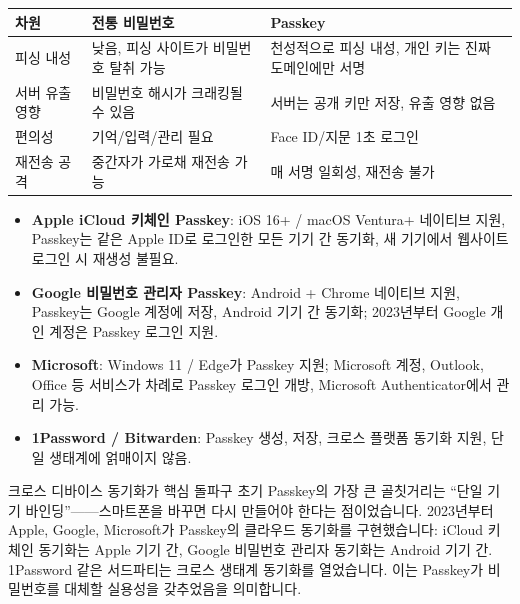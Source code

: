 
\begin{center}
\begin{tabularx}{\linewidth}{|X|X|X|}
\hline
\textbf{차원} & \textbf{전통 비밀번호} & \textbf{Passkey} \tabularnewline
\hline
피싱 내성 & 낮음, 피싱 사이트가 비밀번호 탈취 가능 & 천성적으로 피싱 내성, 개인 키는 진짜 도메인에만 서명 \tabularnewline
서버 유출 영향 & 비밀번호 해시가 크래킹될 수 있음 & 서버는 공개 키만 저장, 유출 영향 없음 \tabularnewline
편의성 & 기억/입력/관리 필요 & Face ID/지문 1초 로그인 \tabularnewline
재전송 공격 & 중간자가 가로채 재전송 가능 & 매 서명 일회성, 재전송 불가 \tabularnewline
\hline
\end{tabularx}
\end{center}


\begin{itemize}
  \item \textbf{Apple iCloud 키체인 Passkey}: iOS 16+ / macOS Ventura+ 네이티브 지원, Passkey는 같은 Apple ID로 로그인한 모든 기기 간 동기화, 새 기기에서 웹사이트 로그인 시 재생성 불필요.
  \item \textbf{Google 비밀번호 관리자 Passkey}: Android + Chrome 네이티브 지원, Passkey는 Google 계정에 저장, Android 기기 간 동기화; 2023년부터 Google 개인 계정은 Passkey 로그인 지원.
  \item \textbf{Microsoft}: Windows 11 / Edge가 Passkey 지원; Microsoft 계정, Outlook, Office 등 서비스가 차례로 Passkey 로그인 개방, Microsoft Authenticator에서 관리 가능.
  \item \textbf{1Password / Bitwarden}: Passkey 생성, 저장, 크로스 플랫폼 동기화 지원, 단일 생태계에 얽매이지 않음.
\end{itemize}

\begin{tcbinfo}{크로스 디바이스 동기화가 핵심 돌파구}
초기 Passkey의 가장 큰 골칫거리는 “단일 기기 바인딩”——스마트폰을 바꾸면 다시 만들어야 한다는 점이었습니다. 2023년부터 Apple, Google, Microsoft가 Passkey의 클라우드 동기화를 구현했습니다: iCloud 키체인 동기화는 Apple 기기 간, Google 비밀번호 관리자 동기화는 Android 기기 간. 1Password 같은 서드파티는 크로스 생태계 동기화를 열었습니다. 이는 Passkey가 비밀번호를 대체할 실용성을 갖추었음을 의미합니다.

\end{tcbinfo}


